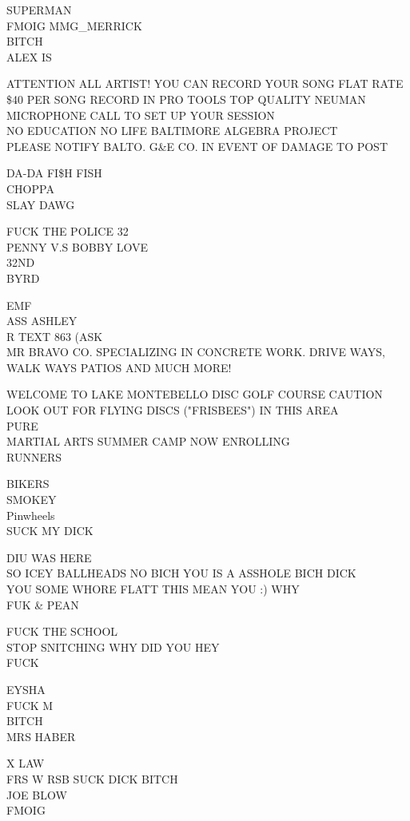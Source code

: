 \documentclass[10pt,letterpaper]{article}
\begin{document}
SUPERMAN\\
FMOIG MMG\_MERRICK\\
BITCH\\
ALEX IS

ATTENTION ALL ARTIST!  YOU CAN RECORD YOUR SONG FLAT RATE \$40 PER SONG RECORD IN PRO TOOLS TOP QUALITY NEUMAN MICROPHONE CALL TO SET UP YOUR SESSION\\
NO EDUCATION NO LIFE BALTIMORE ALGEBRA PROJECT\\
PLEASE NOTIFY BALTO. G\&E CO. IN EVENT OF DAMAGE TO POST

DA{-}DA FI\$H FISH\\
CHOPPA\\
SLAY DAWG

FUCK THE POLICE 32\\
PENNY V.S BOBBY LOVE\\
32ND\\
BYRD

EMF\\
ASS ASHLEY\\
R TEXT 863 (ASK\\
MR BRAVO CO. SPECIALIZING IN CONCRETE WORK.  DRIVE WAYS, WALK WAYS PATIOS AND MUCH MORE!

WELCOME TO LAKE MONTEBELLO DISC GOLF COURSE CAUTION LOOK OUT FOR FLYING DISCS ("FRISBEES") IN THIS AREA\\
PURE\\
MARTIAL ARTS SUMMER CAMP NOW ENROLLING\\
RUNNERS

BIKERS\\
SMOKEY\\
Pinwheels\\
SUCK MY DICK

DIU WAS HERE\\
SO ICEY BALLHEADS NO BICH YOU IS A ASSHOLE BICH DICK\\
YOU SOME WHORE FLATT THIS MEAN YOU :) WHY\\
FUK \& PEAN

FUCK THE SCHOOL\\
STOP SNITCHING WHY DID YOU HEY\\
FUCK

EYSHA\\
FUCK M\\
BITCH\\
MRS HABER

X LAW\\
FRS W RSB SUCK DICK BITCH\\
JOE BLOW\\
FMOIG
\end{document}
